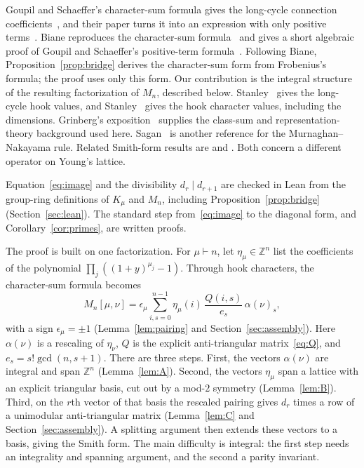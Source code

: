 \documentclass[11pt]{article}
\theoremstyle{remark}
\newcommand{\Z}{\mathbb{Z}}
\begin{document}
Goupil and Schaeffer's character-sum formula gives the long-cycle connection
coefficients~\cite[equation (4), as identified in Biane]{GoupilSchaeffer},
and their paper turns it into an expression with only positive
terms~\cite[as described in Biane, p.~1]{GoupilSchaeffer}.
Biane reproduces the character-sum formula~\cite[equations (1)--(2)]{Biane}
and gives a short algebraic proof of Goupil and Schaeffer's positive-term
formula~\cite[pp.~1--3, final expression]{Biane}.
Following Biane, Proposition~\ref{prop:bridge} derives the character-sum
form from Frobenius's formula; the proof uses only this form.
Our contribution is the integral structure of the resulting factorization
of $M_n$, described below.
Stanley~\cite[Lemma 2.1]{StanleyFactorizations} gives the long-cycle
hook values, and Stanley~\cite[Lemma 2.2]{StanleyFactorizations} gives
the hook character values, including the dimensions. Grinberg's exposition~\cite[Definition 3.9.4(c), Theorem 3.9.5 and Corollary 5.17.41]{Grinberg}
supplies the class-sum and representation-theory background used here.
Sagan~\cite[\S4.10]{Sagan} is another reference for the Murnaghan--Nakayama rule.
Related Smith-form results are
\cite[Theorems 5.1--5.2]{StanleySurvey} and
\cite[Theorem 1.2]{CaiStanley}. Both concern a different operator on Young's lattice.

Equation~\eqref{eq:image} and the divisibility $d_r\mid d_{r+1}$ are
checked in Lean from the group-ring definitions of $K_\mu$ and $M_n$,
including Proposition~\ref{prop:bridge} (Section~\ref{sec:lean}). The
standard step from~\eqref{eq:image} to the diagonal form, and
Corollary~\ref{cor:primes}, are written proofs.

The proof is built on one factorization. For $\mu\vdash n$, let
$\eta_\mu\in\Z^n$ list the coefficients of the polynomial
$\prod_j((1+y)^{\mu_j}-1)$. Through hook characters, the character-sum
formula becomes
\[
 M_n[\mu,\nu]=\epsilon_\mu\sum_{i,s=0}^{n-1}\eta_\mu(i)\,
 \frac{Q(i,s)}{e_s}\,\alpha(\nu)_s,
\]
with a sign $\epsilon_\mu=\pm1$ (Lemma~\ref{lem:pairing} and
Section~\ref{sec:assembly}). Here $\alpha(\nu)$ is a rescaling of
$\eta_\nu$, $Q$ is the explicit anti-triangular matrix~\eqref{eq:Q},
and $e_s=s!\gcd(n,s+1)$.
There are three steps. First, the vectors $\alpha(\nu)$ are integral and
span $\Z^n$ (Lemma~\ref{lem:A}). Second, the vectors $\eta_\mu$ span a lattice with an
explicit triangular basis, cut out by a mod-$2$ symmetry
(Lemma~\ref{lem:B}). Third, on the $r$th vector of that basis the
rescaled pairing gives $d_r$ times a row of a unimodular anti-triangular
matrix (Lemma~\ref{lem:C} and Section~\ref{sec:assembly}). A splitting
argument then extends these vectors to a basis, giving the Smith form.
The main difficulty is integral: the first step needs an integrality and
spanning argument, and the second a parity invariant.
\end{document}
